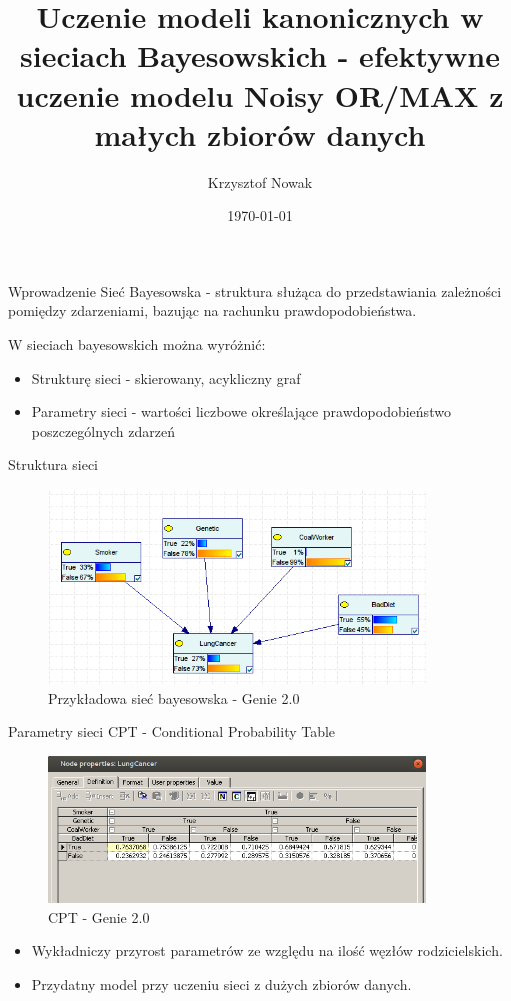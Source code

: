 \documentclass{beamer}
\title[Sieci Bayesowskie]{Uczenie modeli kanonicznych w sieciach Bayesowskich - efektywne uczenie modelu Noisy OR/MAX z małych zbiorów danych}
\author{Krzysztof Nowak}
\institute{Politechnika Białostocka}
\date{\today}
\begin{document}
\begin{frame}
\titlepage
\end{frame}

\begin{frame}{Wprowadzenie}
	Sieć Bayesowska - struktura służąca do przedstawiania zależności pomiędzy zdarzeniami, bazując na rachunku prawdopodobieństwa.


	\pause W sieciach bayesowskich można wyróżnić:
	\begin{itemize}
		\pause \item Strukturę sieci - skierowany, acykliczny graf
		\pause \item Parametry sieci - wartości liczbowe określające prawdopodobieństwo poszczególnych zdarzeń
	\end{itemize}
	
\end{frame}

\begin{frame}{Struktura sieci}
	\begin{figure}[h!]
		\centering
		\includegraphics[width=10cm]{1.png}
		\caption{Przykładowa sieć bayesowska - Genie 2.0}
	\end{figure}
\end{frame}

\begin{frame}{Parametry sieci}
	CPT - Conditional Probability Table
	\begin{figure}[h!]
		\centering
		\includegraphics[width=10cm]{2.png}
		\caption{CPT - Genie 2.0}
	\end{figure}
	\begin{itemize}
		\item Wykładniczy przyrost parametrów ze względu na ilość węzłów rodzicielskich.
		\item Przydatny model przy uczeniu sieci z dużych zbiorów danych.
	\end{itemize}
\end{frame}
\end{document}
